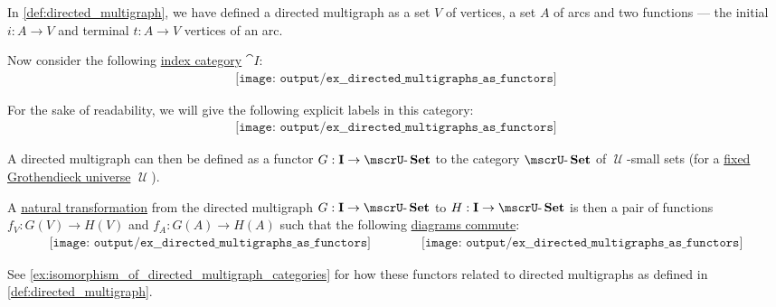 \begin{example}\label{ex:directed_multigraphs_as_functors}
  In \cref{def:directed_multigraph}, we have defined a directed multigraph as a set \( V \) of vertices, a set \( A \) of arcs and two functions --- the initial \( i: A \to V \) and terminal \( t: A \to V \) vertices of an arc.

  Now consider the following \hyperref[def:categorical_diagram]{index category} \( \cat{I}: \)
  \begin{equation}\label{eq:ex:directed_multigraphs_as_functors/index/dots}
    \begin{aligned}
      \texttt{[image: output/ex\_\_directed\_multigraphs\_as\_functors]}
    \end{aligned}
  \end{equation}

  For the sake of readability, we will give the following explicit labels in this category:
  \begin{equation}\label{eq:ex:directed_multigraphs_as_functors/index/annotated}
    \begin{aligned}
      \texttt{[image: output/ex\_\_directed\_multigraphs\_as\_functors]}
    \end{aligned}
  \end{equation}

  A directed multigraph can then be defined as a functor \( G: \cat{I} \to \ucat{Set} \) to the category \hyperref[def:category_of_small_sets]{\( \ucat{Set} \)} of \( \mscrU \)-small sets (for a \hyperref[def:category_size]{fixed Grothendieck universe} \( \mscrU \)).

  A \hyperref[def:natural_transformation]{natural transformation} from the directed multigraph \( G: \cat{I} \to \ucat{Set} \) to \( H: \cat{I} \to \ucat{Set} \) is then a pair of functions \( f_V: G(V) \to H(V) \) and \( f_A: G(A) \to H(A) \) such that the following \hyperref[def:categorical_diagram]{diagrams commute}:
  \begin{equation}\label{eq:ex:directed_multigraphs_as_functors/index/diagram}
    \begin{aligned}
      \texttt{[image: output/ex\_\_directed\_multigraphs\_as\_functors]}
      \quad\quad\quad\quad
      \texttt{[image: output/ex\_\_directed\_multigraphs\_as\_functors]}
    \end{aligned}
  \end{equation}

  See \cref{ex:isomorphism_of_directed_multigraph_categories} for how these functors related to directed multigraphs as defined in \cref{def:directed_multigraph}.
\end{example}

